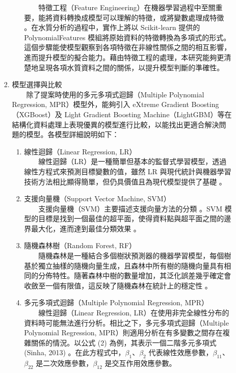 \documentclass[12pt,a4paper]{article}
\begin{document}
\begin{enumerate}
\begin{enumerate}[label=\arabic*.]
\begin{enumerate}[label=2-2-\arabic*.]
\begin{enumerate}[label=\Alph*.]
                　　特徵工程（Feature Engineering）在機器學習過程中至關重要，能將資料轉換成模型可以理解的特徵，或將變數處理成特徵 \cite{ref28}。在水質分析的過程中，實作上將以 Scikit-learn 提供的 PolynomialFeatures 模組將原始資料的特徵轉換為多項式的形式。這個步驟能使模型觀察到各項特徵在非線性關係之間的相互影響，進而提升模型的擬合能力。藉由特徵工程的處理，本研究能夠更清楚地呈現各項水質資料之間的關係，以提升模型判斷的準確性。
            \end{enumerate}
        \item 模型選擇與比較\\
        　　除了提案時使用的多元多項式迴歸（Multiple Polynomial Regression, MPR）模型外，能夠引入 eXtreme Gradient Boosting（XGBoost）及 Light Gradient Boosting Machine（LightGBM）等在結構化資料處理上表現優異的模型進行比較，以能找出更適合解決問題的模型。各模型詳細說明如下：
            \begin{enumerate}[label=\Alph*.]
                \item 線性迴歸（Linear Regression, LR）\\
                　　線性迴歸（LR）是一種簡單但基本的監督式學習模型，透過線性方程式來預測目標變數的值，雖然 LR 與現代統計與機器學習技術方法相比顯得簡單，但仍具價值且為現代模型提供了基礎 \cite{ref29}。
                \item 支援向量機（Support Vector Machine, SVM）\\
                　　支援向量機（SVM）主要描述支援向量方法的分類 \cite{ref30}。SVM 模型的目標是找到一個最佳的超平面，使得資料點與超平面之間的邊界最大化，進而達到最佳分類效果 \cite{ref31}。
                \item 隨機森林樹（Random Forest, RF）\\
                　　隨機森林是一種結合多個樹狀預測器的機器學習模型，每個樹基於獨立抽樣的隨機向量生成，且森林中所有樹的隨機向量具有相同的分佈特性。隨著森林中樹的數量增加，其泛化誤差幾乎確定會收斂至一個有限值，這反映了隨機森林在統計上的穩定性 \cite{ref32}。
                \item 多元多項式迴歸（Multiple Polynomial Regression, MPR）\\
                　　線性迴歸（Linear Regression, LR）在使用非完全線性分布的資料時可能無法進行分析。相比之下，多元多項式迴歸（Multiple Polynomial Regression, MPR）則適用分析在有多變數之間存在複雜關係的情況。以公式 (2) 為例，其表示一個二階多元多項式 (Sinha, 2013) \cite{ref33}。在此方程式中，$\beta_1$、$\beta_2$ 代表線性效應參數，$\beta_{11}$、$\beta_{22}$ 是二次效應參數，$\beta_{12}$ 是交互作用效應參數。
                    \begin{equation}

\end{equation}
\end{enumerate}
\end{enumerate}
\end{enumerate}
\end{enumerate}
\end{document}
